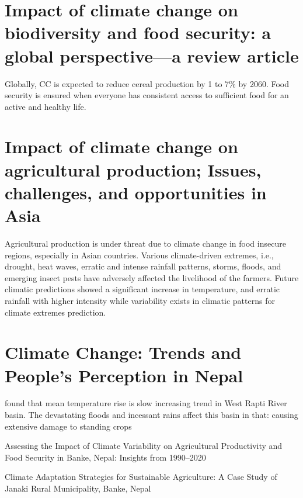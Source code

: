 \documentclass[a4paper,12pt]{article}
\begin{document}
\section{Impact of climate change on biodiversity and food security: a global perspective—a review article}
\parencite{mulunehImpactClimateChange2021}
Globally, CC is expected to reduce cereal production by 1 to 7\% by 2060.
Food security is ensured when everyone has consistent access to sufficient food for an active and healthy life.

\section{Impact of climate change on agricultural production; Issues, challenges, and opportunities in Asia}
\parencite{habib-ur-rahmanImpactClimateChange2022}
Agricultural production is under threat due to climate change in food insecure regions, especially in Asian countries. Various climate-driven extremes, i.e., drought, heat waves, erratic and intense rainfall patterns, storms, floods, and emerging insect pests have adversely affected the livelihood of the farmers. Future climatic predictions showed a significant increase in temperature, and erratic rainfall with higher intensity while variability exists in climatic patterns for climate extremes prediction.

\section{Climate Change: Trends and People’s  Perception in Nepal}
\parencite{devkotaClimateChangeTrends2014}
\parencite{devkotaClimateChangeTrends2014} found that mean temperature rise is slow increasing trend in West Rapti River basin. The devastating floods and incessant rains affect this basin in that: causing extensive damage to standing crops








Assessing the Impact of Climate Variability on Agricultural Productivity and Food Security in Banke, Nepal: Insights from 1990--2020


Climate Adaptation Strategies for Sustainable Agriculture: A Case Study of Janaki Rural Municipality, Banke, Nepal 





























\printbibliography
\end{document}
